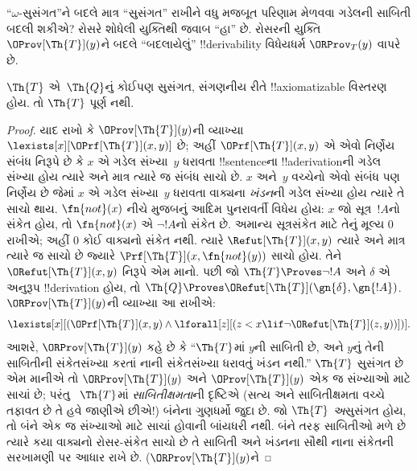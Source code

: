\documentclass[../../../include/open-logic-section]{subfiles}
\begin{document}


``$\omega$-સુસંગત''ને
બદલે માત્ર ``સુસંગત''
રાખીને વધુ મજબૂત
પરિણામ મેળવવા ગડેલની
સાબિતી બદલી શકીએ?
રોસરે શોધેલી યુક્તિથી
જવાબ ``હા'' છે.
રોસરની યુક્તિ
$\OProv[\Th{T}](y)$ને
બદલે ``બદલાયેલું''
!!{derivability} વિધેયધર્મ
$\ORProv_T(y)$ વાપરે છે.

\begin{thm}
$\Th{T}$ એ~$\Th{Q}$નું
કોઈપણ સુસંગત,
સંગણનીય રીતે !!{axiomatizable} વિસ્તરણ
હોય. તો $\Th{T}$
પૂર્ણ નથી.
\end{thm}

\begin{proof}
યાદ રાખો કે
$\OProv[\Th{T}](y)$ની
વ્યાખ્યા
$\lexists[x][\OPrf[\Th{T}](x,
  y)]$ છે; અહીં
$\OPrf[\Th{T}](x, y)$
એ એવો નિર્ણેય સંબંધ
નિરૂપે છે કે $x$ એ
ગડેલ સંખ્યા~$y$
ધરાવતા !!{sentence}ના
!!a{derivation}ની ગડેલ
સંખ્યા હોય ત્યારે અને
માત્ર ત્યારે જ સંબંધ
સાચો છે. $x$ અને~$y$
વચ્ચેનો એવો સંબંધ પણ
નિર્ણેય છે જેમાં $x$ એ
ગડેલ સંખ્યા~$y$ ધરાવતા
વાક્યના \emph{ખંડન}ની
ગડેલ સંખ્યા હોય ત્યારે
તે સાચો થાય. $\fn{not}(x)$
નીચે મુજબનું આદિમ
પુનરાવર્તી વિધેય હોય:
$x$ જો સૂત્ર~$!A$નો
સંકેત હોય, તો
$\fn{not}(x)$ એ
$\lnot
!A$નો સંકેત છે. અમાન્ય સૂત્રસંકેત માટે તેનું મૂલ્ય
$0$ રાખીએ; અહીં $0$ કોઈ વાક્યનો સંકેત નથી.
ત્યારે $\Refut[\Th{T}](x, y)$
ત્યારે અને માત્ર ત્યારે જ
સાચો છે જ્યારે
$\Prf[\Th{T}](x, \fn{not}(y))$
સાચો હોય. તેને
$\ORefut[\Th{T}](x, y)$
નિરૂપે એમ માનો. પછી
જો $\Th{T} \Proves \lnot !A$
અને $\delta$ એ અનુરૂપ
!!{derivation} હોય, તો
$\Th{Q} \Proves
\ORefut[\Th{T}](\gn{\delta}, \gn{!A})$.
$\ORProv[\Th{T}](y)$ની
વ્યાખ્યા આ રાખીએ:
\[
\lexists[x][(\OPrf[\Th{T}](x,y) \land \lforall[z][(z < x \lif \lnot
  \ORefut[\Th{T}](z,y))])].
\]
આશરે, $\ORProv[\Th{T}](y)$
કહે છે કે ``$\Th{T}$માં
$y$ની સાબિતી છે, અને
$y$નું તેની સાબિતીની
સંકેતસંખ્યા કરતાં નાની
સંકેતસંખ્યા ધરાવતું
ખંડન નથી.''
$\Th{T}$ સુસંગત
છે એમ માનીએ તો
$\ORProv[\Th{T}](y)$ અને
$\OProv[\Th{T}](y)$
એક જ સંખ્યાઓ માટે
સાચાં છે; પરંતુ
~$\Th{T}$માં
\emph{સાબિતીક્ષમતા}ની
દૃષ્ટિએ (સત્ય અને
સાબિતીક્ષમતા વચ્ચે તફાવત
છે તે હવે જાણીએ છીએ!)
બંનેના ગુણધર્મો જુદા છે.
જો $\Th{T}$
\emph{અ}સુસંગત હોય,
તો બંને એક જ સંખ્યાઓ માટે સાચાં હોવાની
બાંયધરી નથી. બંને તરફ સાબિતીઓ મળે છે ત્યારે
કયા વાક્યનો રોસર-સંકેત સાચો છે તે સાબિતી અને
ખંડનના સૌથી નાના સંકેતની સરખામણી પર આધાર રાખે છે.
($\ORProv[\Th{T}](y)$ને

\end{proof}
\end{document}
